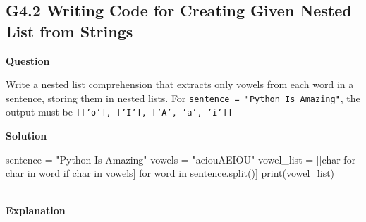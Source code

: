 \documentclass[10pt]{extarticle}
\begin{document}
\subsection*{G4.2 Writing Code for Creating Given Nested List from Strings}

\textbf{Question}

Write a nested list comprehension that extracts only vowels from each word in a sentence, storing them in nested lists. For \texttt{sentence = "Python Is Amazing"}, the output must be \texttt{[['o'], ['I'], ['A', 'a', 'i']]}

\noindent\textbf{Solution}

\begin{python}
sentence = "Python Is Amazing"
vowels = "aeiouAEIOU"
vowel_list = [[char for char in word if char in vowels] for word in sentence.split()]
print(vowel_list)
\end{python}  \\

\noindent\textbf{Explanation}
\end{document}
